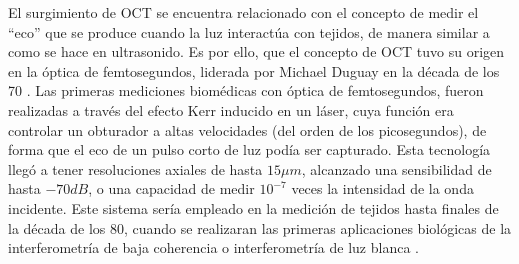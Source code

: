 
El surgimiento de OCT se encuentra relacionado con el concepto de medir el ``eco'' que se produce cuando la luz interactúa con tejidos, de manera similar a como se hace en ultrasonido. Es por ello, que el concepto de OCT tuvo su origen en la óptica de femtosegundos, liderada por Michael Duguay en la década de los 70 \cite{Duguay1971}. Las primeras mediciones biomédicas con óptica de femtosegundos, fueron realizadas a través del efecto Kerr inducido en un láser, cuya función era controlar un obturador a altas velocidades (del orden de los picosegundos), de forma que el eco de un pulso corto de luz podía ser capturado. Esta tecnología llegó a tener resoluciones axiales de hasta $15\mu m$, alcanzado una sensibilidad de hasta $-70dB$, o una capacidad de medir $10^{-7}$ veces la intensidad de la onda incidente. Este sistema sería empleado en la medición de tejidos hasta finales de la década de los 80, cuando se realizaran las primeras aplicaciones biológicas de la interferometría de baja coherencia o interferometría de luz blanca \cite{Fercher1988}. 

